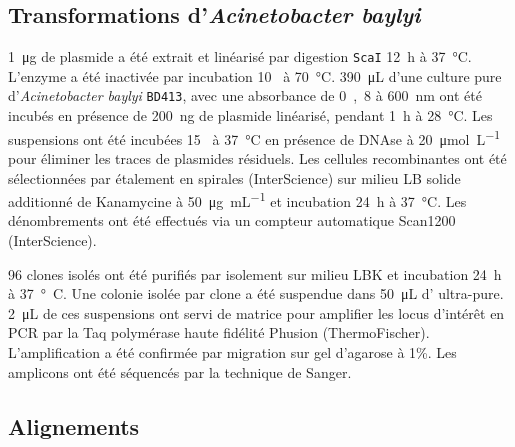 \subsection{Transformations d'\emph{Acinetobacter baylyi}}
\label{subsec:transfo}

\si{1\ug} de plasmide a été extrait et linéarisé par digestion \texttt{ScaI}
\si{12\hour} à \si{37\celsius}. L'enzyme a été inactivée par incubation
\si{10\min} à \si{70\celsius}. \si{390\uL} d'une culture pure
d'\emph{Acinetobacter baylyi} \texttt{BD413}, avec une absorbance de \si{0,8} à
\si{600\nm} ont été incubés en présence de \si{200\ng} de plasmide linéarisé,
pendant \si{1\hour} à \si{28\celsius}. Les suspensions ont été incubées
\si{15\min} à \si{37\celsius} en présence de DNAse à \SI{20}{\umol\per\L} pour
éliminer les traces de plasmides résiduels. Les cellules recombinantes ont été
sélectionnées par étalement en spirales (InterScience) sur milieu LB solide
additionné de Kanamycine à \SI{50}{\ug\per\mL} et incubation \SI{24}{\hour} à
\SI{37}{\celsius}. Les dénombrements ont été effectués via un compteur
automatique Scan\textsuperscript{\textregistered}1200 (InterScience).

96 clones isolés ont été purifiés par isolement sur milieu LBK et incubation
\SI{24}{\hour} à \si{37°C}. Une colonie isolée par clone a été suspendue dans
\SI{50}{\uL} d' ultra-pure. \SI{2}{\uL} de ces suspensions ont servi de
matrice pour amplifier les locus d'intérêt en PCR par la Taq polymérase
haute fidélité Phusion (ThermoFischer). L'amplification a été confirmée par
migration sur gel d'agarose à 1\%. Les amplicons ont été séquencés par la
technique de Sanger.

\subsection{Alignements}
\label{subsec:align}


